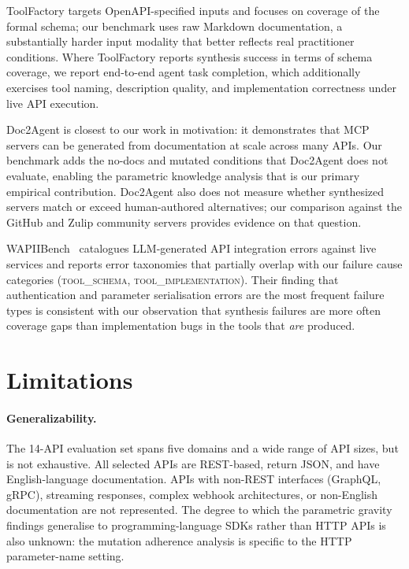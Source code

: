 \documentclass[12pt]{report}
\begin{document}
ToolFactory targets OpenAPI-specified inputs and focuses on coverage of the
formal schema; our benchmark uses raw Markdown documentation, a substantially
harder input modality that better reflects real practitioner conditions. Where
ToolFactory reports synthesis success in terms of schema coverage, we report
end-to-end agent task completion, which additionally exercises tool naming,
description quality, and implementation correctness under live API execution.

Doc2Agent is closest to our work in motivation: it demonstrates that MCP
servers can be generated from documentation at scale across many APIs. Our
benchmark adds the no-docs and mutated conditions that Doc2Agent does not
evaluate, enabling the parametric knowledge analysis that is our primary
empirical contribution. Doc2Agent also does not measure whether synthesized
servers match or exceed human-authored alternatives; our comparison against
the GitHub and Zulip community servers provides evidence on that question.

WAPIIBench~\cite{wapiibench2025} catalogues LLM-generated API integration
errors against live services and reports error taxonomies that partially
overlap with our failure cause categories (\textsc{tool\_schema},
\textsc{tool\_implementation}). Their finding that authentication and
parameter serialisation errors are the most frequent failure types is
consistent with our observation that synthesis failures are more often
coverage gaps than implementation bugs in the tools that \emph{are} produced.

\section{Limitations}

\paragraph{Generalizability.}
The 14-API evaluation set spans five domains and a wide range of API sizes,
but is not exhaustive. All selected APIs are REST-based, return JSON, and
have English-language documentation. APIs with non-REST interfaces (GraphQL,
gRPC), streaming responses, complex webhook architectures, or non-English
documentation are not represented. The degree to which the parametric gravity
findings generalise to programming-language SDKs rather than HTTP APIs is
also unknown: the mutation adherence analysis is specific to the HTTP
parameter-name setting.
\end{document}
